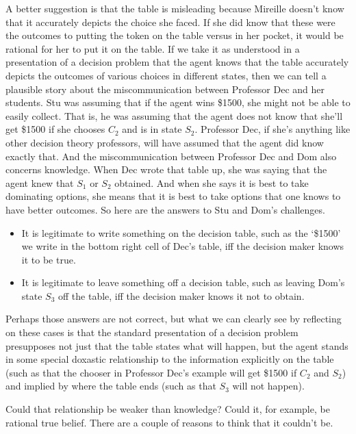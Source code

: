 \documentclass[11pt,]{book}
\providecommand{\tightlist}{%
  \setlength{\itemsep}{0pt}\setlength{\parskip}{0pt}}
\begin{document}
A better suggestion is that the table is misleading because Mireille doesn't know that it accurately depicts the choice she faced. If she did know that these were the outcomes to putting the token on the table versus in her pocket, it would be rational for her to put it on the table. If we take it as understood in a presentation of a decision problem that the agent knows that the table accurately depicts the outcomes of various choices in different states, then we can tell a plausible story about the miscommunication between Professor Dec and her students. Stu was assuming that if the agent wins \$1500, she might not be able to easily collect. That is, he was assuming that the agent does not know that she'll get \$1500 if she chooses \(C_2\) and is in state \(S_2\). Professor Dec, if she's anything like other decision theory professors, will have assumed that the agent did know exactly that. And the miscommunication between Professor Dec and Dom also concerns knowledge. When Dec wrote that table up, she was saying that the agent knew that \(S_1\) or \(S_2\) obtained. And when she says it is best to take dominating options, she means that it is best to take options that one knows to have better outcomes. So here are the answers to Stu and Dom's challenges.

\begin{itemize}
\tightlist
\item
  It is legitimate to write something on the decision table, such as the `\$1500' we write in the bottom right cell of Dec's table, iff the decision maker knows it to be true.
\item
  It is legitimate to leave something off a decision table, such as leaving Dom's state \(S_3\) off the table, iff the decision maker knows it not to obtain.
\end{itemize}

Perhaps those answers are not correct, but what we can clearly see by reflecting on these cases is that the standard presentation of a decision problem presupposes not just that the table states what will happen, but the agent stands in some special doxastic relationship to the information explicitly on the table (such as that the chooser in Professor Dec's example will get \$1500 if \(C_2\) and \(S_2\)) and implied by where the table ends (such as that \(S_3\) will not happen).

Could that relationship be weaker than knowledge? Could it, for example, be rational true belief. There are a couple of reasons to think that it couldn't be.
\end{document}
